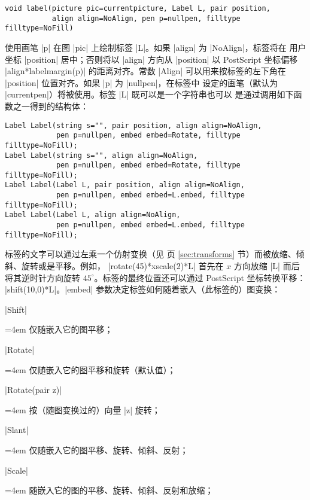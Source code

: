 \documentclass[nofonts,CJKnormalspaces]{ctexbook}[2009/05/20]
\newenvironment{funclist}{\trivlist
  \parindent=0pt
\item[]
  \def\item{\medskip\par\leftskip=0pt}
  \def\go{\par\leftskip=4em}}
{\endtrivlist}
\newcommand*\prgname[1]{\textsf{#1}}
\begin{document}
\begin{lstlisting}
void label(picture pic=currentpicture, Label L, pair position,
           align align=NoAlign, pen p=nullpen, filltype filltype=NoFill)
\end{lstlisting}
使用画笔 |p| 在图 |pic| 上绘制标签 |L|。如果 |align| 为 |NoAlign|，标签将在
用户坐标 |position| 居中；否则将以 |align| 方向从 |position| 以
\prgname{PostScript} 坐标偏移 |align*labelmargin(p)| 的距离对齐。常数 |Align|
可以用来按标签的左下角在 |position| 位置对齐。如果 |p| 为 |nullpen|，在标签中
设定的画笔（默认为 |currentpen|）将被使用。标签 |L| 既可以是一个字符串也可以
是通过调用如下函数之一得到的结构体：
\begin{lstlisting}
Label Label(string s="", pair position, align align=NoAlign,
            pen p=nullpen, embed embed=Rotate, filltype filltype=NoFill);
Label Label(string s="", align align=NoAlign,
            pen p=nullpen, embed embed=Rotate, filltype filltype=NoFill);
Label Label(Label L, pair position, align align=NoAlign,
            pen p=nullpen, embed embed=L.embed, filltype filltype=NoFill);
Label Label(Label L, align align=NoAlign,
            pen p=nullpen, embed embed=L.embed, filltype filltype=NoFill);
\end{lstlisting}
标签的文字可以通过左乘一个仿射变换（见 \pageref{sec:transforms} 页
\ref{sec:transforms} 节）而被放缩、倾斜、旋转或是平移。例如，%
|rotate(45)*xscale(2)*L| 首先在 $x$ 方向放缩 |L| 而后将其逆时针方向旋转
$45^\circ$。标签的最终位置还可以通过 \prgname{PostScript} 坐标转换平移：%
|shift(10,0)*L|。|embed| 参数决定标签如何随着嵌入（此标签的）图变换：
\begin{funclist}
\item |Shift| \go
  仅随嵌入它的图平移；
\item |Rotate| \go
  仅随嵌入它的图平移和旋转（默认值）；
\item |Rotate(pair z)| \go
  按（随图变换过的）向量 |z| 旋转；
\item |Slant| \go
  仅随嵌入它的图平移、旋转、倾斜、反射；
\item |Scale| \go
  随嵌入它的图的平移、旋转、倾斜、反射和放缩；
\end{funclist}
\end{document}
